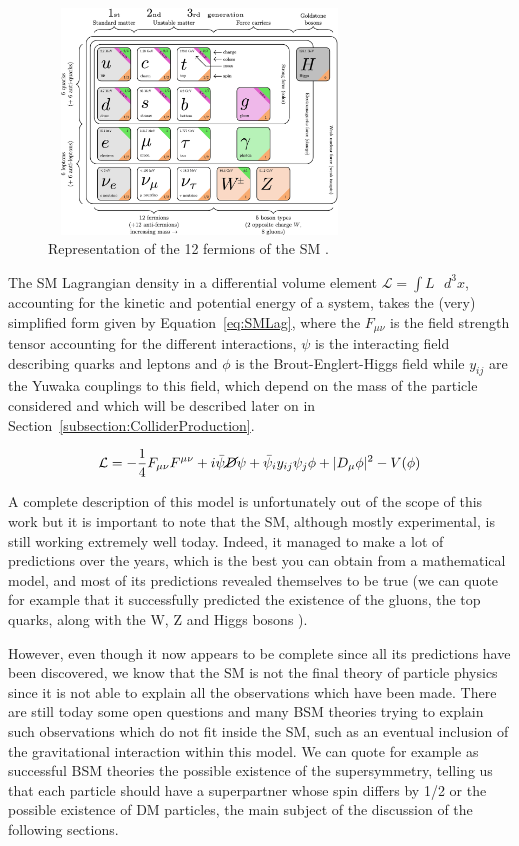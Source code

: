 \documentclass[a4paper, 10pt, openright]{report}
\begin{document}
\begin{figure}[htbp]
\begin{center}
\includegraphics[width=8cm, height=6cm]{figs/SMFermions.png}
\caption{Representation of the 12 fermions of the \ac{SM} \cite{SMFermions}.}
\label{figure:SMFermions}
\end{center}
\end{figure}

The \ac{SM} Lagrangian density in a differential volume element $\mathcal{L} = \int L \text{ } d^3x$, accounting for the kinetic and potential energy of a system, takes the (very) simplified form given by Equation~\ref{eq:SMLag}, where the $F_{\mu \nu}$ is the field strength tensor accounting for the different interactions, $\psi$ is the interacting field describing quarks and leptons and $\phi$ is the Brout-Englert-Higgs field while $y_{ij}$ are the Yuwaka couplings to this field, which depend on the mass of the particle considered and which will be described later on in Section~\ref{subsection:ColliderProduction}.

\begin{equation}
\mathcal{L} = - \frac{1}{4} F_{\mu \nu} F^{\mu \nu} + i \bar{\psi} \cancel{D} \psi + \bar{\psi}_i y_{ij} \psi_j \phi + |D_\mu \phi|^2 - V(\phi)
\label{eq:SMLag}
\end{equation}

A complete description of this model is unfortunately out of the scope of this work but it is important to note that the \ac{SM}, although mostly experimental, is still working extremely well today. Indeed, it managed to make a lot of predictions over the years, which is the best you can obtain from a mathematical model, and most of its predictions revealed themselves to be true (we can quote for example that it successfully predicted the existence of the gluons, the top quarks, along with the W, Z and Higgs bosons \cite{SMPredictions}).

However, even though it now appears to be complete since all its predictions have been discovered, we know that the \ac{SM} is not the final theory of particle physics since it is not able to explain all the observations which have been made. There are still today some open questions and many \acf{BSM} theories trying to explain such observations which do not fit inside the \ac{SM}, such as an eventual inclusion of the gravitational interaction within this model. We can quote for example as successful \ac{BSM} theories the possible existence of the supersymmetry, telling us that each particle should have a superpartner whose spin differs by 1/2 or the possible existence of \acf{DM} particles, the main subject of the discussion of the following sections.
\end{document}

